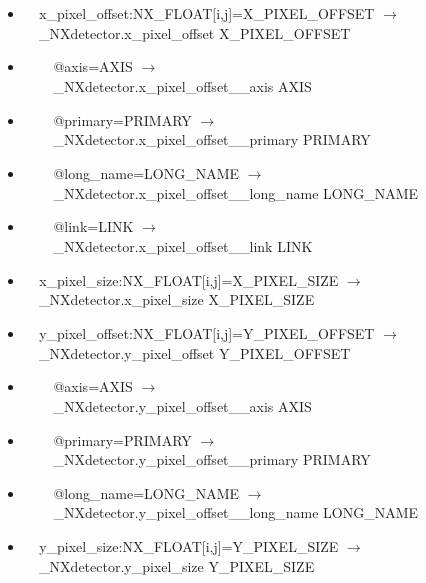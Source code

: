 \documentclass[11pt]{article}
\begin{document}
{{\begin{itemize}
\item{\verb|  |x\_pixel\_offset:NX\_FLOAT[i,j]=X\_PIXEL\_OFFSET $\rightarrow$\\
\verb|  |\_NXdetector.x\_pixel\_offset X\_PIXEL\_OFFSET}

\item{\verb|    |@axis=AXIS $\rightarrow$\\
\verb|    |\_NXdetector.x\_pixel\_offset\_\_axis AXIS}

\item{\verb|    |@primary=PRIMARY $\rightarrow$\\
\verb|    |\_NXdetector.x\_pixel\_offset\_\_primary PRIMARY}

\item{\verb|    |@long\_name=LONG\_NAME $\rightarrow$\\
\verb|    |\_NXdetector.x\_pixel\_offset\_\_long\_name LONG\_NAME}

\item{\verb|    |@link=LINK $\rightarrow$\\
\verb|    |\_NXdetector.x\_pixel\_offset\_\_link LINK}

\item{\verb|  |x\_pixel\_size:NX\_FLOAT[i,j]=X\_PIXEL\_SIZE $\rightarrow$\\
\verb|  |\_NXdetector.x\_pixel\_size X\_PIXEL\_SIZE}

\item{\verb|  |y\_pixel\_offset:NX\_FLOAT[i,j]=Y\_PIXEL\_OFFSET $\rightarrow$\\
\verb|  |\_NXdetector.y\_pixel\_offset Y\_PIXEL\_OFFSET}

\item{\verb|    |@axis=AXIS $\rightarrow$\\
\verb|    |\_NXdetector.y\_pixel\_offset\_\_axis AXIS}

\item{\verb|    |@primary=PRIMARY $\rightarrow$\\
\verb|    |\_NXdetector.y\_pixel\_offset\_\_primary PRIMARY}

\item{\verb|    |@long\_name=LONG\_NAME $\rightarrow$\\
\verb|    |\_NXdetector.y\_pixel\_offset\_\_long\_name LONG\_NAME}

\item{\verb|  |y\_pixel\_size:NX\_FLOAT[i,j]=Y\_PIXEL\_SIZE $\rightarrow$\\
\verb|  |\_NXdetector.y\_pixel\_size Y\_PIXEL\_SIZE}


\end{itemize}}}
\end{document}
